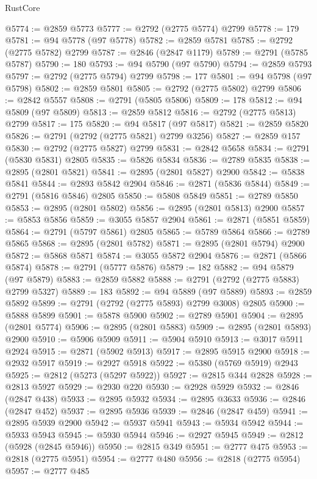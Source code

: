 \begin{lexlean}{RustCore}
\begin{coremodule}
@5774 := @2859 @5773
@5777 := @2792 (@2775 @5774) @2799
@5778 := 179
@5781 := @94 @5778 (@97 @5778)
@5782 := @2859 @5781
@5785 := @2792 (@2775 @5782) @2799
@5787 := @2846 (@2847 @1179)
@5789 := @2791 (@5785 @5787)
@5790 := 180
@5793 := @94 @5790 (@97 @5790)
@5794 := @2859 @5793
@5797 := @2792 (@2775 @5794) @2799
@5798 := 177
@5801 := @94 @5798 (@97 @5798)
@5802 := @2859 @5801
@5805 := @2792 (@2775 @5802) @2799
@5806 := @2842 @5557
@5808 := @2791 (@5805 @5806)
@5809 := 178
@5812 := @94 @5809 (@97 @5809)
@5813 := @2859 @5812
@5816 := @2792 (@2775 @5813) @2799
@5817 := 175
@5820 := @94 @5817 (@97 @5817)
@5821 := @2859 @5820
@5826 := @2791 (@2792 (@2775 @5821) @2799 @3256)
@5827 := @2859 @157
@5830 := @2792 (@2775 @5827) @2799
@5831 := @2842 @5658
@5834 := @2791 (@5830 @5831) @2805
@5835 := @5826 @5834
@5836 := @2789 @5835
@5838 := @2895 (@2801 @5821)
@5841 := @2895 (@2801 @5827) @2900
@5842 := @5838 @5841
@5844 := @2893 @5842 @2904
@5846 := @2871 (@5836 @5844)
@5849 := @2791 (@5816 @5846) @2805
@5850 := @5808 @5849
@5851 := @2789 @5850
@5853 := @2895 (@2801 @5802)
@5856 := @2895 (@2801 @5813) @2900
@5857 := @5853 @5856
@5859 := @3055 @5857 @2904
@5861 := @2871 (@5851 @5859)
@5864 := @2791 (@5797 @5861) @2805
@5865 := @5789 @5864
@5866 := @2789 @5865
@5868 := @2895 (@2801 @5782)
@5871 := @2895 (@2801 @5794) @2900
@5872 := @5868 @5871
@5874 := @3055 @5872 @2904
@5876 := @2871 (@5866 @5874)
@5878 := @2791 (@5777 @5876)
@5879 := 182
@5882 := @94 @5879 (@97 @5879)
@5883 := @2859 @5882
@5888 := @2791 (@2792 (@2775 @5883) @2799 @5327)
@5889 := 183
@5892 := @94 @5889 (@97 @5889)
@5893 := @2859 @5892
@5899 := @2791 (@2792 (@2775 @5893) @2799 @3008) @2805
@5900 := @5888 @5899
@5901 := @5878 @5900
@5902 := @2789 @5901
@5904 := @2895 (@2801 @5774)
@5906 := @2895 (@2801 @5883)
@5909 := @2895 (@2801 @5893) @2900
@5910 := @5906 @5909
@5911 := @5904 @5910
@5913 := @3017 @5911 @2924
@5915 := @2871 (@5902 @5913)
@5917 := @2895 @5915 @2900
@5918 := @2932 @5917
@5919 := @2927 @5918
@5922 := @5380 (@5769 @5919) @2943
@5925 := @2812 (@5273 (@5297 @5922))
@5927 := @2815 @344 @2828
@5928 := @2813 @5927
@5929 := @2930 @220
@5930 := @2928 @5929
@5932 := @2846 (@2847 @438)
@5933 := @2895 @5932
@5934 := @2895 @3633
@5936 := @2846 (@2847 @452)
@5937 := @2895 @5936
@5939 := @2846 (@2847 @459)
@5941 := @2895 @5939 @2900
@5942 := @5937 @5941
@5943 := @5934 @5942
@5944 := @5933 @5943
@5945 := @5930 @5944
@5946 := @2927 @5945
@5949 := @2812 (@5928 (@2845 @5946))
@5950 := @2815 @349
@5951 := @2777 @475
@5953 := @2818 (@2775 @5951)
@5954 := @2777 @480
@5956 := @2818 (@2775 @5954)
@5957 := @2777 @485

\end{coremodule}
\end{lexlean}
